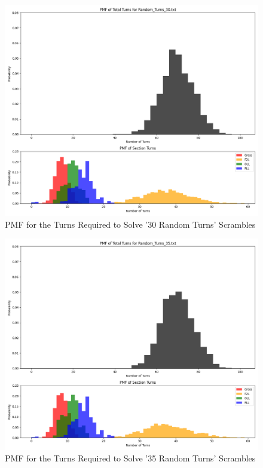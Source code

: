 \documentclass[12pt,letterpaper]{article}
\numberwithin{equation}{section}
\begin{document}
	\begin{figure}[H]
		\centering
		 \includegraphics[width=6in]{pmf_turns_30.png}
		 \caption{PMF for the Turns Required to Solve '30 Random Turns' Scrambles}
		 \label{fig:pmf_turns_30_plot}
	\end{figure}
	
	\begin{figure}[H]
		\centering
		 \includegraphics[width=6in]{pmf_turns_35.png}
		 \caption{PMF for the Turns Required to Solve '35 Random Turns' Scrambles}
		 \label{fig:pmf_turns_35_plot}
	\end{figure}
	
\end{document}
